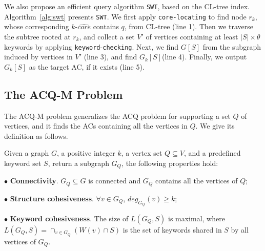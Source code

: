 {We also propose an efficient query algorithm {\tt SWT}, based on the CL-tree index.
Algorithm~\ref{alg:swt} presents {\tt SWT}. We first apply {\tt core-locating} to find node $r_k$, whose corresponding $k$-$\widehat {core}$ contains $q$, from CL-tree (line 1).
Then we traverse the subtree rooted at $r_k$, and collect a set $V'$ of vertices containing at least $|S|\times \theta$ keywords by applying {\tt keyword}-{\tt checking}.
Next, we find $G[S]$ from the subgraph induced by vertices in $V'$ (line 3),
and find $G_k[S]$(line 4).
Finally, we output $G_k[S]$ as the target AC, if it exists (line 5).



\subsection{The ACQ-M Problem}

The ACQ-M problem generalizes the ACQ problem for supporting a set $Q$ of vertices, and it finds the ACs containing all the vertices in $Q$. We give its definition as follows.

\begin{problem}
\label{ACQ-M}
Given a graph $G$, a positive integer $k$, a vertex set $Q$$\subseteq$$V$, and a predefined keyword set $S$, return a subgraph $G_Q$, the following properties hold:

$\bullet$ \textbf{Connectivity}. $G_Q \subseteq G$ is connected and $G_Q$ contains all the vertices of $Q$;

$\bullet$ \textbf{Structure cohesiveness}. $\forall$$v\in G_Q$, $deg_{G_Q}(v)\geq$$k$;

$\bullet$ \textbf{Keyword cohesiveness}. The size of $L(G_Q, S)$ is maximal, where $L(G_Q, S)=\cap_{v \in G_Q}(W(v)\cap S)$ is the set of keywords shared in $S$ by all vertices of $G_Q$.
\end{problem}

}

